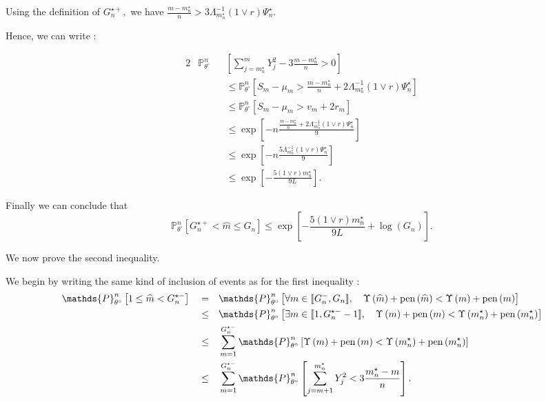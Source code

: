 Using the definition of $G_{n}^{\star+},$ we have $\frac{m - m_{n}^{\star}}{n} > 3 \Lambda_{m_{n}^{\star}}^{-1}\left(1 \vee r\right) \Psi_{n}^{\star}.$

Hence, we can write :

\begin{alignat*}{2}
& \mathds{P}_{\theta^{\circ}}^{n}&&\left[\sum\limits_{j = m_{n}^{\star}}^{m} Y_{j}^{2} - 3 \frac{m - m_{n}^{\star}}{n} > 0\right]\\
& &&\leq \mathds{P}_{\theta^{\circ}}^{n}\left[S_{m} - \mu_{m} > \frac{m - m_{n}^{\star}}{n} + 2 \Lambda_{m_{n}^{\star}}^{-1} \left(1 \vee r \right) \Psi_{n}^{\star}\right]\\
& &&\leq \mathds{P}_{\theta^{\circ}}^{n}\left[S_{m} - \mu_{m} > v_{m} + 2 r_{m}\right]\\
& &&\leq \exp\left[- n\frac{\frac{m - m_{n}^{\star}}{n} + 2 \Lambda_{m_{n}^{\star}}^{-1} \left(1 \vee r\right) \Psi_{n}^{\star}}{9}\right]\\
& &&\leq \exp\left[- n \frac{5 \Lambda_{m_{n}^{\star}}^{-1} \left( 1 \vee r\right) \Psi_{n}^{\star}}{9}\right]\\
& &&\leq \exp\left[- \frac{5 \left( 1 \vee r\right) m_{n}^{\star}}{9 L}\right].
\end{alignat*}

Finally we can conclude that
\[\mathds{P}_{\theta^{\circ}}^{n}\left[G_{n}^{\star+} < \widehat{m} \leq G_{n}\right] \leq \exp\left[- \frac{5 \left( 1 \vee r\right) m_{n}^{\star}}{9 L} + \log\left(G_{n}\right)\right].\]

\bigskip

We now prove the second inequality.

We begin by writing the same kind of inclusion of events as for the first inequality :
\begin{alignat*}{3}
& \mathds{P}_{\theta^{\circ}}^{n} \left[1 \leq \widehat{m} < G_{n}^{\star-}\right] && = && \mathds{P}_{\theta^{\circ}}^{n} \left[ \forall m \in \llbracket G_{n}^{-}, G_{n} \rrbracket, \quad \Upsilon\left(\widehat{m}\right) + \pen\left(\widehat{m}\right) < \Upsilon\left(m\right) + \pen\left(m\right)\right]\\
& && \leq && \mathds{P}_{\theta^{\circ}}^{n} \left[ \exists m \in \llbracket 1, G_{n}^{\star-} -1 \rrbracket, \quad \Upsilon\left(m\right) + \pen\left(m\right) < \Upsilon\left(m_{n}^{\star}\right) + \pen\left(m_{n}^{\star}\right)\right]\\
& && \leq && \sum\limits_{m = 1}^{G_{n}^{\star-}} \mathds{P}_{\theta^{\circ}}^{n} \left[\Upsilon\left(m\right) + \pen\left(m\right) < \Upsilon\left(m_{n}^{\star}\right) + \pen\left(m_{n}^{\star}\right)\right]\\
& && \leq && \sum\limits_{m = 1}^{G_{n}^{\star-}} \mathds{P}_{\theta^{\circ}}^{n}\left[\sum\limits_{j = m + 1}^{m_{n}^{\star}} Y_{j}^{2} < 3 \frac{m_{n}^{\star} - m}{n} \right].
\end{alignat*}

